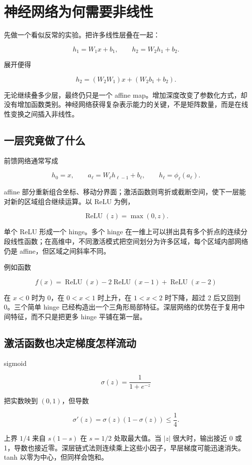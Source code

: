 \section{神经网络为何需要非线性}

先做一个看似反常的实验。把许多线性层叠在一起：

\[
h_1=W_1x+b_1,\qquad
h_2=W_2h_1+b_2.
\]

展开便得

\[
h_2=(W_2W_1)x+(W_2b_1+b_2).
\]

无论继续叠多少层，最终仍只是一个 affine map。增加深度改变了参数化方式，却没有增加函数类别。神经网络获得复杂表示能力的关键，不是矩阵数量，而是在线性变换之间插入非线性。

\subsection{一层究竟做了什么}

前馈网络通常写成

\[
h_0=x,\qquad
a_\ell=W_\ell h_{\ell-1}+b_\ell,\qquad
h_\ell=\phi_\ell(a_\ell).
\]

affine 部分重新组合坐标、移动分界面；激活函数则弯折或截断空间，使下一层能对新的区域组合继续运算。以 ReLU 为例，

\[
\operatorname{ReLU}(z)=\max(0,z).
\]

单个 ReLU 形成一个 hinge。多个 hinge 在一维上可以拼出具有多个折点的连续分段线性函数；在高维中，不同激活模式把空间划分为许多区域，每个区域内部网络仍是 affine，但区域之间斜率不同。

例如函数

\[
f(x)=\operatorname{ReLU}(x)
-2\operatorname{ReLU}(x-1)
+\operatorname{ReLU}(x-2)
\]

在 \(x<0\) 时为 0，在 \(0<x<1\) 时上升，在 \(1<x<2\) 时下降，超过 2 后又回到 0。三个简单 hinge 已经构造出一个三角形局部特征。深层网络的优势在于复用中间特征，而不只是把更多 hinge 平铺在第一层。

\subsection{激活函数也决定梯度怎样流动}

sigmoid

\[
\sigma(z)=\frac1{1+e^{-z}}
\]

把实数映到 \((0,1)\)，但导数

\[
\sigma'(z)=\sigma(z)(1-\sigma(z))\le\frac14.
\]

上界 \(1/4\) 来自 \(s(1-s)\) 在 \(s=1/2\) 处取最大值。当 \(|z|\) 很大时，输出接近 0 或 1，导数也接近零。深层链式法则连续乘上这些小因子，早层梯度可能迅速消失。tanh 以零为中心，但同样会饱和。

